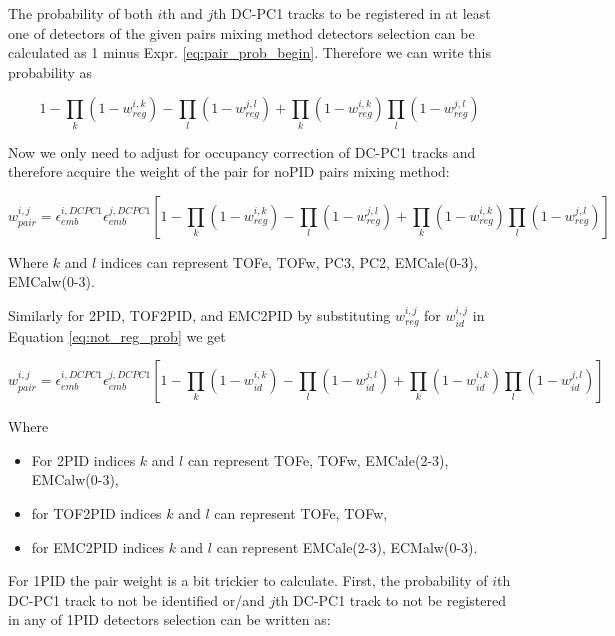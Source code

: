 The probability of both $i$th and $j$th DC-PC1 tracks to be registered in at least one of detectors of the given pairs mixing method detectors selection can be calculated as 1 minus Expr. \ref{eq:pair_prob_begin}. Therefore we can write this probability as

\begin{equation}
	1 - \prod_{k} \left( 1 - w_{reg}^{i, k} \right) -
	\prod_{l} \left( 1 - w_{reg}^{j, l} \right) +
	\prod_{k} \left( 1 - w_{reg}^{i, k} \right) \prod_{l} 
	\left( 1 - w_{reg}^{j, l} \right)
	\label{eq:pair_prob}
\end{equation}

Now we only need to adjust for occupancy correction of DC-PC1 tracks and therefore acquire the weight of the pair for noPID pairs mixing method:

\begin{equation}
	w_{pair}^{i,j} = \epsilon_{emb}^{i, DCPC1} \epsilon_{emb}^{j, DCPC1} 
	\left[ 1 - 
	\prod_{k} \left( 1 - w_{reg}^{i, k} \right) -
	\prod_{l} \left( 1 - w_{reg}^{j, l} \right) +
	\prod_{k} \left( 1 - w_{reg}^{i, k} \right) 
	\prod_{l} \left( 1 - w_{reg}^{j, l} \right)
	\right]
\end{equation}

Where $k$ and $l$ indices can represent TOFe, TOFw, PC3, PC2, EMCale(0-3), EMCalw(0-3).

Similarly for 2PID, TOF2PID, and EMC2PID by substituting $w_{reg}^{i,j}$ for $w_{id}^{i,j}$ in Equation \ref{eq:not_reg_prob} we get

\begin{equation}
	w_{pair}^{i,j} = \epsilon_{emb}^{i, DCPC1} \epsilon_{emb}^{j, DCPC1} 
	\left[ 1 -
	\prod_{k} \left( 1 - w_{id}^{i, k} \right) -
	\prod_{l} \left( 1 - w_{id}^{j, l} \right) +
	\prod_{k} \left( 1 - w_{id}^{i, k} \right) 
	\prod_{l} \left( 1 - w_{id}^{j, l} \right)
	\right]
\end{equation}

Where
\begin{itemize}
	\item For 2PID indices $k$ and $l$ can represent TOFe, TOFw, EMCale(2-3), EMCalw(0-3),
	\item for TOF2PID indices $k$ and $l$ can represent TOFe, TOFw,
	\item for EMC2PID indices $k$ and $l$ can represent EMCale(2-3), ECMalw(0-3).
\end{itemize}

For 1PID the pair weight is a bit trickier to calculate. First, the probability of $i$th DC-PC1 track to not be identified or/and $j$th DC-PC1 track to not be registered in any of 1PID detectors selection can be written as:

